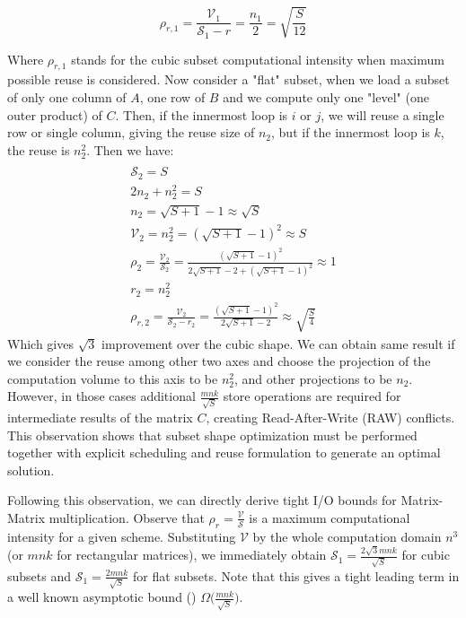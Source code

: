 \documentclass[sigplan,review,anonymous]{acmart}\settopmatter{printfolios=true,printccs=false,printacmref=false}
\begin{document}
$$\rho_{r,1} = \frac{\mathcal{V}_1}{\mathcal{S}_1 - r} = \frac{n_1}{2} = 
\sqrt{\frac{S}{12}}$$

Where $\rho_{r,1}$ stands for the cubic subset computational intensity 
when maximum 
possible reuse is considered. Now consider a "flat" subset, when we load 
a subset of only one column of $A$, one row of $B$ and we compute only one 
"level" (one outer product) of $C$. Then, if the innermost loop is $i$ or 
$j$, we will reuse a single row or single column, giving the reuse size of 
$n_2$, but if the innermost loop is $k$, the reuse is $n_2^2$. Then we 
have: 	
\begin{multline}
\label{eq:flat}
\\
\mathcal{S}_2 = S \\
2n_2 + n_2^2 = S \\
n_2 = \sqrt{S + 1} - 1 \approx \sqrt{S} \\
\mathcal{V}_2 = n_2^2 = (\sqrt{S + 1} - 1)^2  \approx S\\
\rho_2 = \frac{\mathcal{V}_2}{\mathcal{S}_2} = \frac{(\sqrt{S + 1} - 
	1)^2}{2\sqrt{S+1} - 2 + (\sqrt{S + 1} - 1)^2} \approx 1\\
r_2 = n_2^2 \\
\rho_{r,2} = \frac{\mathcal{V}_2}{\mathcal{S}_2 - r_2} = \frac{(\sqrt{S + 
		1} - 
	1)^2}{2\sqrt{S+1} - 2} \approx \sqrt{\frac{S}{4}} 
\end{multline}	
Which gives $\sqrt{3}$ improvement over the cubic shape. We can obtain same 
result if we consider the reuse among other two axes and choose the 
projection of the computation volume to this axis to be $n_2^2$, and other 
projections to be $n_2$. However, in those cases additional 
$\frac{mnk}{\sqrt{S}}$ 
store operations are required for intermediate results of the matrix $C$, 
creating Read-After-Write (RAW) conflicts. This 
observation shows that subset shape 
optimization must be performed together with explicit scheduling and reuse 
formulation to generate an optimal solution.

Following this observation, we can directly derive tight I/O bounds for 
Matrix-Matrix multiplication. Observe that $\rho_r = 
\frac{\mathcal{V}}{\mathcal{S}}$ is a maximum computational intensity for a 
given scheme. Substituting $\mathcal{V}$ by the whole computation domain $n^3$ 
(or $mnk$ for rectangular matrices), we immediately obtain $\mathcal{S}_1 = 
\frac{2\sqrt{3}mnk}{\sqrt{S}}$ for cubic subsets and $\mathcal{S}_1 = 
\frac{2mnk}{\sqrt{S}}$ for flat subsets. Note that this gives a tight 
leading term in a well known asymptotic bound (\cite{redblue}) 
$\Omega\big(\frac{mnk}{\sqrt{S}}\big)$.
\end{document}
